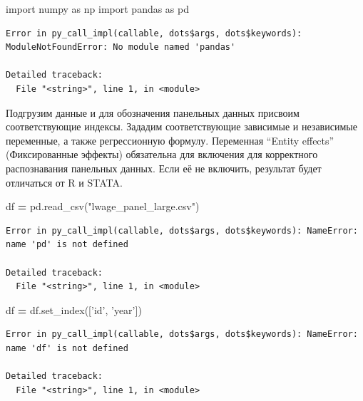 \documentclass[]{book}
\newenvironment{Shaded}{\begin{snugshade}}{\end{snugshade}}
\newcommand{\ImportTok}[1]{#1}
\newcommand{\NormalTok}[1]{#1}
\newcommand{\OperatorTok}[1]{\textcolor[rgb]{0.81,0.36,0.00}{\textbf{#1}}}
\newcommand{\StringTok}[1]{\textcolor[rgb]{0.31,0.60,0.02}{#1}}
\begin{document}
\begin{Shaded}
\begin{Highlighting}[]
\ImportTok{import}\NormalTok{ numpy }\ImportTok{as}\NormalTok{ np}
\ImportTok{import}\NormalTok{ pandas }\ImportTok{as}\NormalTok{ pd}
\end{Highlighting}
\end{Shaded}

\begin{verbatim}
Error in py_call_impl(callable, dots$args, dots$keywords): ModuleNotFoundError: No module named 'pandas'

Detailed traceback: 
  File "<string>", line 1, in <module>
\end{verbatim}

Подгрузим данные и для обозначения панельных данных присвоим соответствующие индексы. Зададим соответствующие зависимые и независимые переменные, а также регрессионную формулу. Переменная ``Entity effects'' (Фиксированные эффекты) обязательна для включения для корректного распознавания панельных данных. Если её не включить, результат будет отличаться от R и STATA.

\begin{Shaded}
\begin{Highlighting}[]
\NormalTok{df }\OperatorTok{=}\NormalTok{ pd.read_csv(}\StringTok{"lwage_panel_large.csv"}\NormalTok{)}
\end{Highlighting}
\end{Shaded}

\begin{verbatim}
Error in py_call_impl(callable, dots$args, dots$keywords): NameError: name 'pd' is not defined

Detailed traceback: 
  File "<string>", line 1, in <module>
\end{verbatim}

\begin{Shaded}
\begin{Highlighting}[]
\NormalTok{df }\OperatorTok{=}\NormalTok{ df.set_index([}\StringTok{'id'}\NormalTok{, }\StringTok{'year'}\NormalTok{])}
\end{Highlighting}
\end{Shaded}

\begin{verbatim}
Error in py_call_impl(callable, dots$args, dots$keywords): NameError: name 'df' is not defined

Detailed traceback: 
  File "<string>", line 1, in <module>
\end{verbatim}
\end{document}
